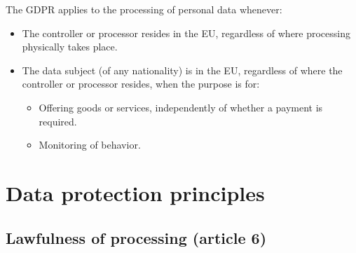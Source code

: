 The GDPR applies to the processing of personal data whenever:
\begin{itemize}
    \item The controller or processor resides in the EU, regardless of where processing physically takes place.
    \item The data subject (of any nationality) is in the EU, regardless of where the controller or processor resides, when the purpose is for:
        \begin{itemize}
            \item Offering goods or services, independently of whether a payment is required.
            \item Monitoring of behavior.
        \end{itemize}
\end{itemize}






\section{Data protection principles}


\subsection{Lawfulness of processing (article 6)} 

